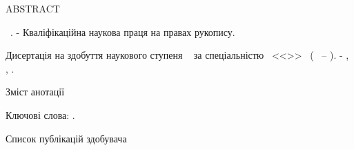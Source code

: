 \noindent
ABSTRACT						

\vspace{0.7cm}
\noindent
\thesisAuthorFIOen~\thesisTitle. - Кваліфікаційна наукова праця на правах рукопису.

\vspace{0.7cm}
\noindent
Дисертація на здобуття наукового ступеня \thesisDegree~ 
за спеціальністю \thesisSpecialtyNumber~<<\thesisSpecialtyTitle>>~
(\thesisKnowledgeNumber~ -- \thesisKnowledgeTitle). - \thesisOrganizationEn, \thesisCityEn, \thesisYear.

\vspace{0.7cm}
Зміст анотації

\vspace{0.7cm}
\noindent
Ключові слова: \keywordsEn.

\vspace{0.7cm}
Список публікацій здобувача 



\clearpage